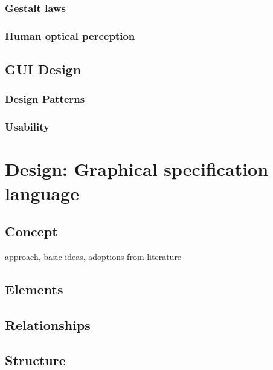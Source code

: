 \documentclass[twoside, openright, 12pt]{book}
\begin{document}
\subsection{Gestalt laws}
\label{gestalt_laws}


\subsection{Human optical perception}
\label{human_optical_perception}




\section{GUI Design}
\label{gui_design}


\subsection{Design Patterns}
\label{design_patterns}


\subsection{Usability}
\label{usability}




\cleardoublepage
\chapter{Design: Graphical specification language}
\label{gsl_design}


\section{Concept}
\label{gsl_concept}
approach, basic ideas, adoptions from literature

\section{Elements}
\label{gsl_elements}


\section{Relationships}
\label{gsl_relationships}


\section{Structure}
\label{gsl_structure}
\end{document}

